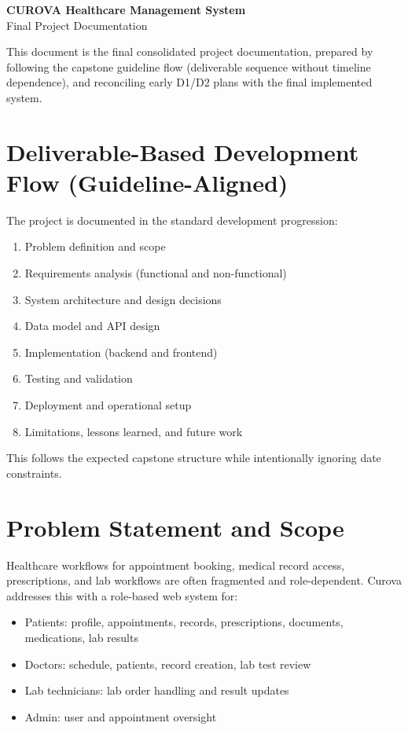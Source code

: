 \documentclass[12pt,a4paper]{article}
\begin{document}
\begin{center}
{\LARGE \textbf{CUROVA Healthcare Management System}}\\[0.3em]
{\large Final Project Documentation}
\end{center}

This document is the final consolidated project documentation, prepared by following the capstone guideline flow (deliverable sequence without timeline dependence), and reconciling early D1/D2 plans with the final implemented system.

\section{Deliverable-Based Development Flow (Guideline-Aligned)}

The project is documented in the standard development progression:
\begin{enumerate}
  \item Problem definition and scope
  \item Requirements analysis (functional and non-functional)
  \item System architecture and design decisions
  \item Data model and API design
  \item Implementation (backend and frontend)
  \item Testing and validation
  \item Deployment and operational setup
  \item Limitations, lessons learned, and future work
\end{enumerate}

This follows the expected capstone structure while intentionally ignoring date constraints.

\section{Problem Statement and Scope}

Healthcare workflows for appointment booking, medical record access, prescriptions, and lab workflows are often fragmented and role-dependent. Curova addresses this with a role-based web system for:

\begin{itemize}
  \item Patients: profile, appointments, records, prescriptions, documents, medications, lab results
  \item Doctors: schedule, patients, record creation, lab test review
  \item Lab technicians: lab order handling and result updates
  \item Admin: user and appointment oversight
\end{itemize}
\end{document}
